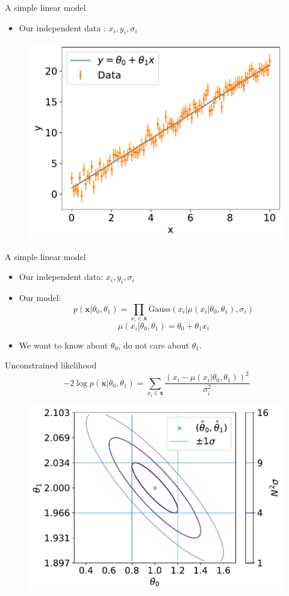 \documentclass[
aspectratio=169,
14pt,
professionalfonts
]{beamer}
\newcommand{\arrow}{~\ding{220}~}
\begin{document}
\begin{frame}{A simple linear model}

    \begin{itemize}
        \item Our independent data : $x_i, y_i, \sigma_i$
    \end{itemize}

    \begin{figure}
        \centering
        \includegraphics[width=0.5\linewidth]{../plots/linear_data.pdf}
    \end{figure}

\end{frame}

\begin{frame}{A simple linear model}
    \begin{itemize}
        \item Our independent data: $x_i, y_i, \sigma_i$
        \item Our model:
        $$ p(\mathbf{x}|\theta_0, \theta_1) = \prod_{x_i \in \mathbf{x}}\text{Gauss}(x_i | \mu(x_i|\theta_0, \theta_1), \sigma_i)$$
        $$\mu(x_i|\theta_0, \theta_1) = \theta_0 + \theta_1 x_i$$
         \item[\arrow] We want to know about $\theta_0$, do not care about $\theta_1$.
    \end{itemize}
\end{frame}

\begin{frame}{Unconstrained likelihood}
\vspace{-1cm}
    $$ -2\log p(\mathbf{x}|\theta_0, \theta_1) = \sum_{x_i \in \mathbf{x}}\frac{\left(x_i -\mu(x_i|\theta_0, \theta_1)\right)^2}{\sigma_i^2}$$
    \begin{figure}
        \centering
        \includegraphics[width=0.5\linewidth]{../plots/nll_unconstr.pdf}
    \end{figure}
\end{frame}
\end{document}
